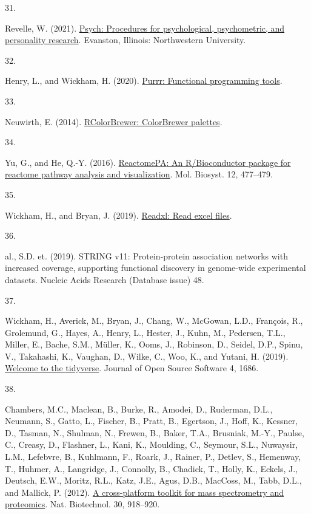 \documentclass[
]{article}
\newlength{\cslhangindent}
\newlength{\csllabelwidth}
\newlength{\cslentryspacingunit} %
\newenvironment{CSLReferences}[2] %
 {%
  \setlength{\parindent}{0pt}
  \ifodd #1
  \let\oldpar\par
  \def\par{\hangindent=\cslhangindent\oldpar}
  \fi
  \setlength{\parskip}{#2\cslentryspacingunit}
 }%
 {}
\newcommand{\CSLLeftMargin}[1]{\parbox[t]{\csllabelwidth}{#1}}
\newcommand{\CSLRightInline}[1]{\parbox[t]{\linewidth - \csllabelwidth}{#1}\break}
\begin{document}
\begin{CSLReferences}{0}{0}
\leavevmode{}%
\CSLLeftMargin{31. }
\CSLRightInline{Revelle, W. (2021). \href{https://CRAN.R-project.org/package=psych}{Psych: Procedures for psychological, psychometric, and personality research}. Evanston, Illinois: Northwestern University.}

\leavevmode{}%
\CSLLeftMargin{32. }
\CSLRightInline{Henry, L., and Wickham, H. (2020). \href{https://CRAN.R-project.org/package=purrr}{Purrr: Functional programming tools}.}

\leavevmode{}%
\CSLLeftMargin{33. }
\CSLRightInline{Neuwirth, E. (2014). \href{https://CRAN.R-project.org/package=RColorBrewer}{RColorBrewer: ColorBrewer palettes}.}

\leavevmode{}%
\CSLLeftMargin{34. }
\CSLRightInline{Yu, G., and He, Q.-Y. (2016). \href{https://doi.org/10.1039/c5mb00663e}{{ReactomePA}: An {R}/{Bioconductor} package for reactome pathway analysis and visualization}. Mol. Biosyst. 12, 477--479.}

\leavevmode{}%
\CSLLeftMargin{35. }
\CSLRightInline{Wickham, H., and Bryan, J. (2019). \href{https://CRAN.R-project.org/package=readxl}{Readxl: Read excel files}.}

\leavevmode{}%
\CSLLeftMargin{36. }
\CSLRightInline{al., S.D. et. (2019). STRING v11: Protein-protein association networks with increased coverage, supporting functional discovery in genome-wide experimental datasets. Nucleic Acids Research (Database issue) 48.}

\leavevmode{}%
\CSLLeftMargin{37. }
\CSLRightInline{Wickham, H., Averick, M., Bryan, J., Chang, W., McGowan, L.D., François, R., Grolemund, G., Hayes, A., Henry, L., Hester, J., Kuhn, M., Pedersen, T.L., Miller, E., Bache, S.M., Müller, K., Ooms, J., Robinson, D., Seidel, D.P., Spinu, V., Takahashi, K., Vaughan, D., Wilke, C., Woo, K., and Yutani, H. (2019). \href{https://doi.org/10.21105/joss.01686}{Welcome to the {tidyverse}}. Journal of Open Source Software 4, 1686.}

\leavevmode{}%
\CSLLeftMargin{38. }
\CSLRightInline{Chambers, M.C., Maclean, B., Burke, R., Amodei, D., Ruderman, D.L., Neumann, S., Gatto, L., Fischer, B., Pratt, B., Egertson, J., Hoff, K., Kessner, D., Tasman, N., Shulman, N., Frewen, B., Baker, T.A., Brusniak, M.-Y., Paulse, C., Creasy, D., Flashner, L., Kani, K., Moulding, C., Seymour, S.L., Nuwaysir, L.M., Lefebvre, B., Kuhlmann, F., Roark, J., Rainer, P., Detlev, S., Hemenway, T., Huhmer, A., Langridge, J., Connolly, B., Chadick, T., Holly, K., Eckels, J., Deutsch, E.W., Moritz, R.L., Katz, J.E., Agus, D.B., MacCoss, M., Tabb, D.L., and Mallick, P. (2012). \href{https://doi.org/10.1038/nbt.2377}{A cross-platform toolkit for mass spectrometry and proteomics}. Nat. Biotechnol. 30, 918--920.}


\end{CSLReferences}
\end{document}
